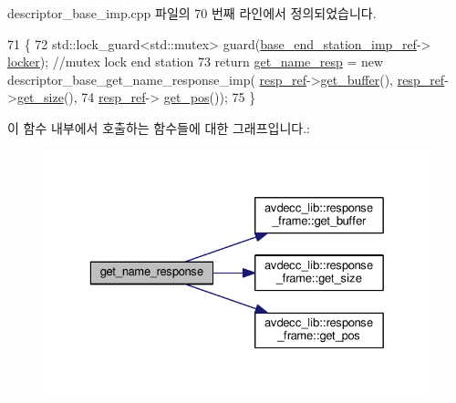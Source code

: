 descriptor\+\_\+base\+\_\+imp.\+cpp 파일의 70 번째 라인에서 정의되었습니다.


\begin{DoxyCode}
71 \{
72     std::lock\_guard<std::mutex> guard(\hyperlink{classavdecc__lib_1_1descriptor__base__imp_a550c969411f5f3b69f55cc139763d224}{base\_end\_station\_imp\_ref}->
      \hyperlink{classavdecc__lib_1_1end__station__imp_a2207f93fef130266b292686bf96ef8d3}{locker}); \textcolor{comment}{//mutex lock end station}
73     \textcolor{keywordflow}{return} \hyperlink{classavdecc__lib_1_1descriptor__base__imp_a7d3a410eb242dc2b7abe9862a1593458}{get\_name\_resp} = \textcolor{keyword}{new} descriptor\_base\_get\_name\_response\_imp(
      \hyperlink{classavdecc__lib_1_1descriptor__base__imp_a2642e3a7c10d38553e7ff4a55e875346}{resp\_ref}->\hyperlink{classavdecc__lib_1_1response__frame_ad4680d622c198b5256c03b2eb2638c22}{get\_buffer}(), \hyperlink{classavdecc__lib_1_1descriptor__base__imp_a2642e3a7c10d38553e7ff4a55e875346}{resp\_ref}->\hyperlink{classavdecc__lib_1_1response__frame_adf55ed6a1edf8e1aa4f3f5f97936ad1e}{get\_size}(),
74                                                                      \hyperlink{classavdecc__lib_1_1descriptor__base__imp_a2642e3a7c10d38553e7ff4a55e875346}{resp\_ref}->
      \hyperlink{classavdecc__lib_1_1response__frame_a4038092b7b420000faefc768241adb42}{get\_pos}());
75 \}
\end{DoxyCode}


이 함수 내부에서 호출하는 함수들에 대한 그래프입니다.\+:
\nopagebreak
\begin{figure}[H]
\begin{center}
\leavevmode
\includegraphics[width=329pt]{classavdecc__lib_1_1descriptor__base__imp_abf130a286ee3ca9d1f41a7e2abbd0d33_cgraph}
\end{center}
\end{figure}




